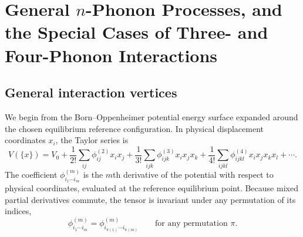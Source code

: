 \section{General \texorpdfstring{$n$}{n}-Phonon Processes, and the Special Cases of Three- and Four-Phonon Interactions}

\subsection{General interaction vertices}
We begin from the Born--Oppenheimer potential energy surface expanded around the chosen equilibrium reference configuration. In physical displacement coordinates $x_i$, the Taylor series is
\begin{equation}
    V(\{x\})
    =
    V_0
    + \frac{1}{2!}\sum_{ij}\phi^{(2)}_{ij}x_i x_j
    + \frac{1}{3!}\sum_{ijk}\phi^{(3)}_{ijk}x_i x_j x_k
    + \frac{1}{4!}\sum_{ijkl}\phi^{(4)}_{ijkl}x_i x_j x_k x_l
    + \cdots.
    \label{eq:pes_taylor_physical}
\end{equation}
The coefficient $\phi^{(m)}_{i_1\cdots i_m}$ is the $m$th derivative of the potential with respect to physical coordinates, evaluated at the reference equilibrium point. Because mixed partial derivatives commute, the tensor is invariant under any permutation of its indices,
\begin{equation}
    \phi^{(m)}_{i_1\cdots i_m} = \phi^{(m)}_{i_{\pi(1)}\cdots i_{\pi(m)}}
    \qquad \text{for any permutation } \pi.
    \label{eq:physical_ifc_permutation_symmetry}
\end{equation}

